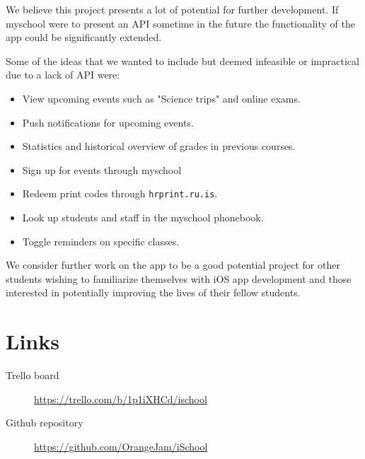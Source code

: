 \documentclass[pdftex, DIV=calc, paper=a4, fontsize=11pt, twocolumn]{scrartcl}	 %
\begin{document}
We believe this project presents a lot of potential for further development. If myschool were to
present an API sometime in the future the functionality of the app could be significantly extended.

Some of the ideas that we wanted to include but deemed infeasible or impractical due to a lack
of API were:

\begin{itemize}
    \item View upcoming events such as "Science trips" and online exams.
    \item Push notifications for upcoming events.
    \item Statistics and historical overview of grades in previous courses.
    \item Sign up for events through myschool
    \item Redeem print codes through \texttt{hrprint.ru.is}.
    \item Look up students and staff in the myschool phonebook.
    \item Toggle reminders on specific classes.
\end{itemize}

We consider further work on the app to be a good potential project for other students wishing to 
familiarize themselves with iOS app development and those interested in potentially improving the
lives of their fellow students. 


\section*{Links}

\begin{description}
    \item[Trello board] \url{https://trello.com/b/1p1iXHCd/ischool}
    \item[Github repository] \url{https://github.com/OrangeJam/iSchool}
\end{description}

\end{document}
